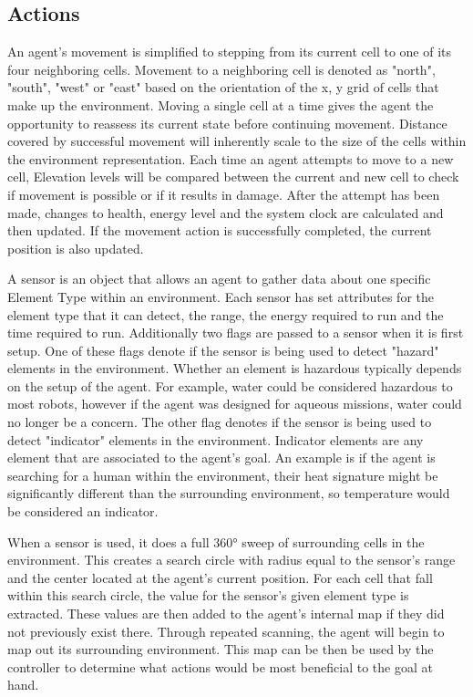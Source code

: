 \subsection{Actions}
An agent's movement is simplified to stepping from its current cell to one of its four neighboring cells.
Movement to a neighboring cell is denoted as "north", "south", "west" or "east" based on the orientation of the x, y grid of cells that make up the environment.
Moving a single cell at a time gives the agent the opportunity to reassess its current state before continuing movement.
Distance covered by successful movement will inherently scale to the size of the cells within the environment representation.
Each time an agent attempts to move to a new cell, Elevation levels will be compared between the current and new cell to check if movement is possible or if it results in damage.
After the attempt has been made, changes to health, energy level and the system clock are calculated and then updated.
If the movement action is successfully completed, the current position is also updated.

A sensor is an object that allows an agent to gather data about one specific Element Type within an environment.
Each sensor has set attributes for the element type that it can detect, the range, the energy required to run and the time required to run.
Additionally two flags are passed to a sensor when it is first setup.
One of these flags denote if the sensor is being used to detect "hazard" elements in the environment.
Whether an element is hazardous typically depends on the setup of the agent.
For example, water could be considered hazardous to most robots, however if the agent was designed for aqueous missions, water could no longer be a concern.
The other flag denotes if the sensor is being used to detect "indicator" elements in the environment.
Indicator elements are any element that are associated to the agent's goal.
An example is if the agent is searching for a human within the environment, their heat signature might be significantly different than the surrounding environment, so temperature would be considered an indicator.

When a sensor is used, it does a full 360° sweep of surrounding cells in the environment.
This creates a search circle with radius equal to the sensor's range and the center located at the agent's current position.
For each cell that fall within this search circle, the value for the sensor's given element type is extracted.
These values are then added to the agent's internal map if they did not previously exist there.
Through repeated scanning, the agent will begin to map out its surrounding environment.
This map can be then be used by the controller to determine what actions would be most beneficial to the goal at hand.


